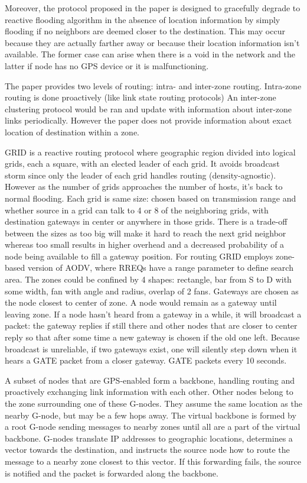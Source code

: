 \documentclass[conference]{IEEEtran}
\begin{document}
Moreover, the protocol proposed in the paper is designed to gracefully degrade to reactive flooding algorithm in the absence of location information by simply flooding if no neighbors are deemed closer to the destination.
This may occur because they are actually farther away or because their location information isn't available.
The former case can arise when there is a void in the network and the latter if node has no GPS device or it is malfunctioning.

\cite{779923} The paper provides two levels of routing: intra- and inter-zone routing.
Intra-zone routing is done proactively (like link state routing protocols)
An inter-zone clustering protocol would be ran and update with information about inter-zone links periodically.
However the paper does not  provide information about exact location of destination within a zone.

\cite{Liao01grid:a} GRID is a reactive routing protocol where geographic region divided into logical grids, each a square, with an elected leader of each grid.
It avoids broadcast storm since only the leader of each grid handles routing (density-agnostic). 
However as the number of grids approaches the number of hosts, it's back to normal flooding.
Each grid is same size: chosen based on transmission range and whether source in a grid can talk to 4 or 8 of the neighboring grids, with destination gateways in center or anywhere in those grids.
There is a trade-off between the sizes as too big will make it hard to reach the next grid neighbor whereas too small results in higher overhead and a decreased probability of a node being available to fill a gateway position.
For routing GRID employs zone-based version of AODV, where RREQs have a range parameter to define search area.
The zones could be confined by 4 shapes: rectangle, bar from S to D with some width, fan with angle and radius, overlap of 2 fans.
Gateways  are chosen as the node closest to center of zone. A node would remain as a gateway until leaving zone.
If a node hasn't heard from a gateway in a while, it will broadcast a packet: the gateway replies if still there and other nodes that are closer to center reply so that after some time a new gateway is chosen if the old one left.
Because broadcast is unreliable, if two gateways exist, one will silently step down when it hears a GATE packet from a closer gateway.
GATE packets every 10 seconds.

\cite{Zaruba2003} A subset of nodes that are GPS-enabled form a backbone, handling routing and proactively exchanging link information with each other.
Other nodes belong to the zone surrounding one of these G-nodes.
They assume the same location as the nearby G-node, but may be a few hops away.
The virtual backbone is formed by a root G-node sending messages to nearby zones until all are a part of the virtual backbone.
G-nodes translate IP addresses to geographic locations, determines a vector towards the destination, and instructs the source node how to route the message to a nearby zone closest to this vector.
If this forwarding fails, the source is notified and the packet is forwarded along the backbone.
\end{document}
